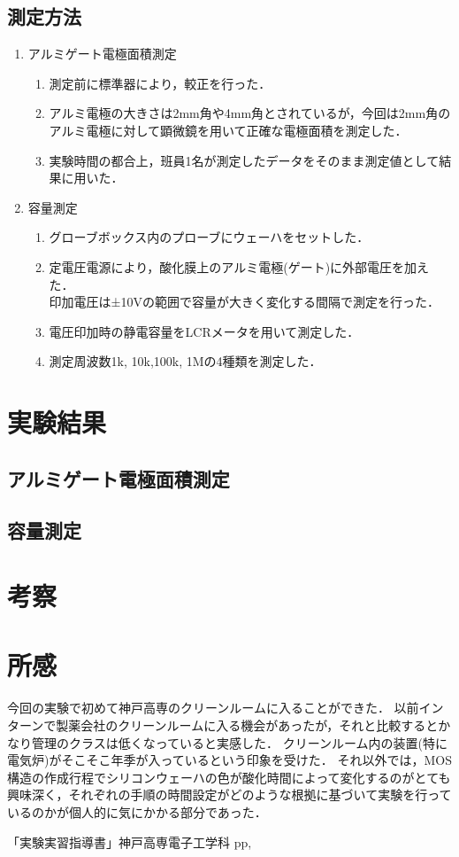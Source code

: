 \documentclass[11pt]{jarticle}
\begin{document}
		\subsection{測定方法}
			\begin{enumerate}
				\item アルミゲート電極面積測定\\
					\begin{enumerate}
						\item 測定前に標準器により，較正を行った．
						\item アルミ電極の大きさは2mm角や4mm角とされているが，今回は2mm角のアルミ電極に対して顕微鏡を用いて正確な電極面積を測定した．
						\item 実験時間の都合上，班員1名が測定したデータをそのまま測定値として結果に用いた．
					\end{enumerate}
				\item 容量測定\\
					\begin{enumerate}
						\item グローブボックス内のプローブにウェーハをセットした．
						\item 定電圧電源により，酸化膜上のアルミ電極(ゲート)に外部電圧を加えた．\\印加電圧は±10Vの範囲で容量が大きく変化する間隔で測定を行った．
						\item 電圧印加時の静電容量をLCRメータを用いて測定した．
						\item 測定周波数1k, 10k,100k, 1Mの4種類を測定した．
					\end{enumerate}
			\end{enumerate}

	\section{実験結果}
		\subsection{アルミゲート電極面積測定}
			
		\subsection{容量測定}

\section{考察}
\section{所感}
	今回の実験で初めて神戸高専のクリーンルームに入ることができた．
	以前インターンで製薬会社のクリーンルームに入る機会があったが，それと比較するとかなり管理のクラスは低くなっていると実感した．
	クリーンルーム内の装置(特に電気炉)がそこそこ年季が入っているという印象を受けた．
	それ以外では，MOS構造の作成行程でシリコンウェーハの色が酸化時間によって変化するのがとても興味深く，それぞれの手順の時間設定がどのような根拠に基づいて実験を行っているのかが個人的に気にかかる部分であった．
\begin{thebibliography}{99}
「実験実習指導書」神戸高専電子工学科 pp,
\end{thebibliography}
\end{document}
